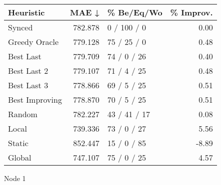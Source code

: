 \begin{tabular}{lrlr}
\toprule
\textbf{Heuristic} & \textbf{MAE ↓} & \textbf{\% Be/Eq/Wo} & \textbf{\% Improv.} \\
\midrule
            Synced &        782.878 &          0 / 100 / 0 &                0.00 \\
     Greedy Oracle &        779.128 &          75 / 25 / 0 &                0.48 \\
         Best Last &        779.709 &          74 / 0 / 26 &                0.40 \\
       Best Last 2 &        779.107 &          71 / 4 / 25 &                0.48 \\
       Best Last 3 &        778.866 &          69 / 5 / 25 &                0.51 \\
    Best Improving &        778.870 &          70 / 5 / 25 &                0.51 \\
            Random &        782.227 &         43 / 41 / 17 &                0.08 \\
             Local &        739.336 &          73 / 0 / 27 &                5.56 \\
            Static &        852.447 &          15 / 0 / 85 &               -8.89 \\
            Global &        747.107 &          75 / 0 / 25 &                4.57 \\
\bottomrule
\end{tabular}
\caption{Node 1}
\label{tab:non_lr01_le1_bs2_1}
